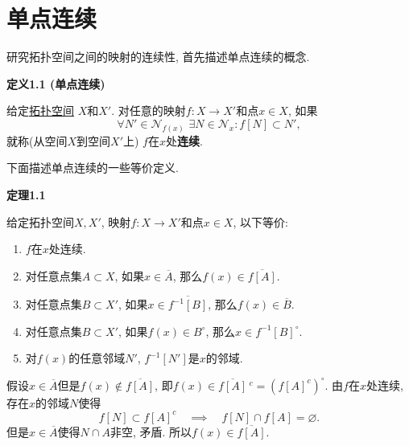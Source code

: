 \documentclass[UTF8]{ctexart}
\begin{document}
\setlength{\abovedisplayskip}{1pt}
\setlength{\belowdisplayskip}{1pt}

\section{单点连续}

研究拓扑空间之间的映射的连续性, 首先描述单点连续的概念.

\vspace{10pt}

\hypertarget{sec:定义1.1}{}
\noindent\textbf{定义1.1 (单点连续)}

给定\href{../01 拓扑空间的概念/01 拓扑空间#nameddest=sec:定义1.1}{拓扑空间}
$X$和$X'$. 对任意的映射$f:X\to X'$和点$x\in X$, 如果
\[
    \forall N'\in\mathcal{N}_{f(x)}\,\,\exists N\in\mathcal{N}_x:f[N]\subset N',
\]
就称(从空间$X$到空间$X'$上) $f$在$x$处\textbf{连续}.

\vspace{10pt}

下面描述单点连续的一些等价定义.

\vspace{10pt}

\hypertarget{sec:定理1.1}{}
\noindent\textbf{定理1.1}

给定拓扑空间$X,X'$, 映射$f:X\to X'$和点$x\in X$, 以下等价:
\begin{enumerate}
    \item $f$在$x$处连续.
    \item 对任意点集$A\subset X$, 如果$x\in\overline{A}$,
    那么$f(x)\in\overline{f[A]}$.
    \item 对任意点集$B\subset X'$, 如果$x\in\overline{f^{-1}[B]}$,
    那么$f(x)\in\overline{B}$.
    \item 对任意点集$B\subset X'$, 如果$f(x)\in B^\circ$,
    那么$x\in f^{-1}[B]^\circ$.
    \item 对$f(x)$的任意邻域$N'$, $f^{-1}[N']$是$x$的邻域.
\end{enumerate}



假设$x\in\overline{A}$但是$f(x)\notin\overline{f[A]}$,
即$f(x)\in\overline{f[A]}\,^c=(f[A]^c)^\circ$. 由$f$在$x$处连续,
存在$x$的邻域$N$使得
\[
    f[N]\subset f[A]^c\quad\implies\quad f[N]\cap f[A]=\varnothing.
\]
但是$x\in\overline{A}$使得$N\cap A$非空, 矛盾. 所以$f(x)\in\overline{f[A]}$.

\end{document}
